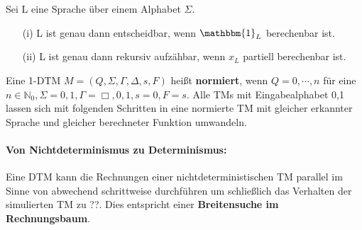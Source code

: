   Sei L eine Sprache über einem Alphabet \(\Sigma\). 
  \begin{itemize}
    \item [(i)] L ist genau dann entscheidbar, wenn \(\mathbbm{1}_L\) berechenbar ist.
    \item [(ii)] L ist genau dann rekursiv aufzähbar, wenn \(x_L\) partiell berechenbar ist.
  \end{itemize}

\newpage

  Eine 1-DTM \(M = (Q, \Sigma, \Gamma, \Delta, s, F)\) heißt \textbf{normiert}, wenn \(Q = {0,\cdots, n}\) für eine \(n \in \mathbb{N}_{0}, \Sigma = {0, 1}, \Gamma = {\Box, 0, 1}, s = 0, F = {s}\). Alle TMs mit Eingabealphabet {0,1} lassen sich mit folgenden Schritten in eine normierte TM mit gleicher erkannter Sprache und gleicher berechneter Funktion umwandeln. 
\paragraph*{Von Nichtdeterminismus zu Determinismus:} 
  Eine DTM kann die Rechnungen einer nichtdeterministischen TM parallel im Sinne von abwechend schrittweise durchführen um schließlich das Verhalten der simulierten TM zu ??. Dies entspricht einer \textbf{Breitensuche im Rechnungsbaum}.
  {}



